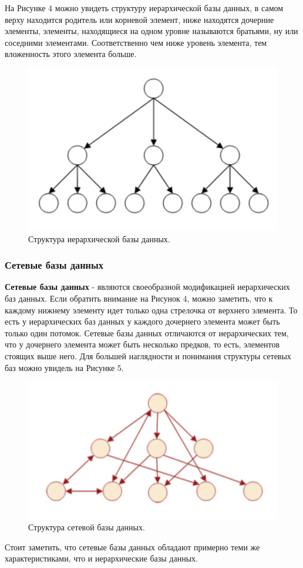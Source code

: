 \documentclass[a4paper, 10pt]{article}
\begin{document}
	\hspace*{5mm}На Рисунке 4 можно увидеть структуру иерархической базы данных, в самом верху находится родитель или корневой элемент, ниже находятся дочерние элементы, элементы, находящиеся на одном уровне называются братьями, ну или соседними элементами. Соответственно чем ниже уровень элемента, тем вложенность этого элемента больше.
	\begin{figure}[h!]
		\centering
		\includegraphics[scale=1]{type1}
		\centering\caption{Структура иерархической базы данных.}
	\end{figure}
	\subsubsection{Сетевые базы данных}
	\hspace*{5mm} \textbf{Сетевые базы данных} - являются своеобразной модификацией иерархических баз данных. Если обратить внимание на Рисунок 4, можно заметить, что к каждому нижнему элементу идет только одна стрелочка от верхнего элемента. То есть у иерархических баз данных у каждого дочернего элемента может быть только один потомок. Сетевые базы данных отличаются от иерархических тем, что у дочернего элемента может быть несколько предков, то есть, элементов стоящих выше него. Для большей наглядности и понимания структуры сетевых баз можно увидель на Рисунке 5.
	\clearpage
	\newpage
	\begin{figure}[h!]
		\centering
		\includegraphics[scale=1.2]{type2}
		\centering\caption{Структура сетевой базы данных.}
	\end{figure}
	\hspace*{5mm}Стоит заметить, что сетевые базы данных обладают примерно теми же характеристиками, что и иерархические базы данных.
\end{document}
